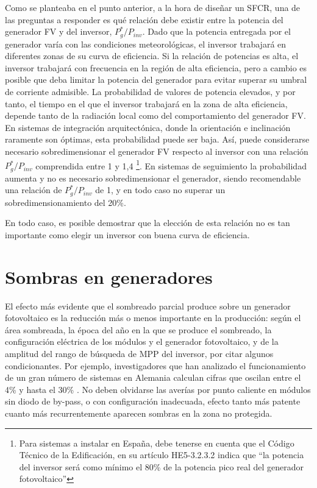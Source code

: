 Como se planteaba en el punto anterior, a la hora de diseñar un SFCR,
una de las preguntas a responder es qué relación debe existir entre
la potencia del generador FV y del inversor, $P_{g}^{*}/P_{inv}$.
Dado que la potencia entregada por el generador varía con las condiciones
meteorológicas, el inversor trabajará en diferentes zonas de su curva
de eficiencia. Si la relación de potencias es alta, el inversor trabajará
con frecuencia en la región de alta eficiencia, pero a cambio es posible
que deba limitar la potencia del generador para evitar superar su
umbral de corriente admisible. La probabilidad de valores de potencia
elevados, y por tanto, el tiempo en el que el inversor trabajará en
la zona de alta eficiencia, depende tanto de la radiación local como
del comportamiento del generador FV. En sistemas de integración arquitectónica,
donde la orientación e inclinación raramente son óptimas, esta probabilidad
puede ser baja. Así, puede considerarse necesario sobredimensionar
el generador FV respecto al inversor con una relación $P_{g}^{*}/P_{inv}$
comprendida entre 1 y 1,4%
\footnote{Para sistemas a instalar en España, debe tenerse en cuenta que el
Código Técnico de la Edificación, en su artículo HE5-3.2.3.2 indica
que {}``la potencia del inversor será como mínimo el 80\% de la potencia
pico real del generador fotovoltaico''%
}. En sistemas de seguimiento la probabilidad aumenta y no es necesario
sobredimensionar el generador, siendo recomendable una relación de
$P_{g}^{*}/P_{inv}$ de 1, y en todo caso no superar un sobredimensionamiento
del 20\%.

En todo caso, es posible demostrar \cite{Lorenzo2005} que la elección
de esta relación no es tan importante como elegir un inversor con
buena curva de eficiencia. 


\section{Sombras en generadores}
\label{sec:sombras}
El efecto más evidente que el sombreado parcial produce sobre un generador
fotovoltaico es la reducción más o menos importante en la producción:
según el área sombreada, la época del año en la que se produce el
sombreado, la configuración eléctrica de los módulos y el generador
fotovoltaico, y de la amplitud del rango de búsqueda de MPP del inversor,
por citar algunos condicionantes. Por ejemplo, investigadores que
han analizado el funcionamiento de un gran número de sistemas en Alemania
calculan cifras que oscilan entre el 4\% y hasta el 30\% \cite{Decker.Jahn1997,Jahn.Nasse2004}.
No deben olvidarse las averías por punto caliente en módulos sin diodo
de by-pass, o con configuración inadecuada, efecto tanto más patente
cuanto más recurrentemente aparecen sombras en la zona no protegida.

